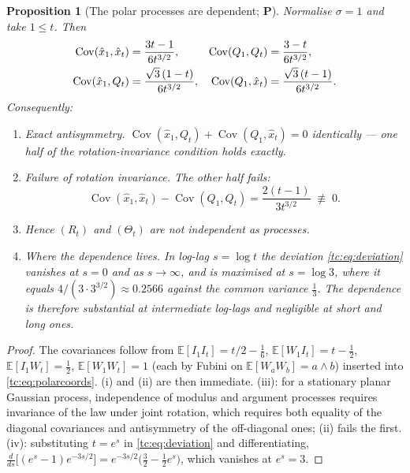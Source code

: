 \documentclass[11pt]{article}
\numberwithin{equation}{section}
\theoremstyle{plain}
\newtheorem{proposition}[theorem]{Proposition}
\theoremstyle{definition}
\theoremstyle{remark}
\newcommand{\E}{\mathbb{E}}
\DeclareMathOperator{\Cov}{Cov}
\begin{document}
\begin{proposition}[The polar processes are dependent; \textbf{P}]
\label{tc:prop:notindep}
Normalise $\sigma=1$ and take $1\le t$. Then
\begin{align}
\Cov(\hat x_1,\hat x_t)&=\frac{3t-1}{6t^{3/2}},
&\Cov(Q_1,Q_t)&=\frac{3-t}{6t^{3/2}},
\label{tc:eq:covs}\\
\Cov(\hat x_1,Q_t)&=\frac{\sqrt3\,(1-t)}{6t^{3/2}},
&\Cov(Q_1,\hat x_t)&=\frac{\sqrt3\,(t-1)}{6t^{3/2}} .
\notag
\end{align}
Consequently:
\begin{enumerate}[label=\emph{(\roman*)},itemsep=1pt]
\item \emph{Exact antisymmetry.}
$\Cov(\hat x_1,Q_t)+\Cov(Q_1,\hat x_t)=0$ identically --- one half of
the rotation-invariance condition holds exactly.
\item \emph{Failure of rotation invariance.} The other half fails:
\begin{equation}\label{tc:eq:deviation}
\Cov(\hat x_1,\hat x_t)-\Cov(Q_1,Q_t)=\frac{2(t-1)}{3t^{3/2}}
\;\not\equiv\;0 .
\end{equation}
\item Hence $(R_t)$ and $(\Theta_t)$ are \emph{not} independent as
processes.
\item \emph{Where the dependence lives.} In log-lag $s=\log t$ the
deviation \eqref{tc:eq:deviation} vanishes at $s=0$ and as
$s\to\infty$, and is maximised at $s=\log3$, where it equals
$4/(3\cdot3^{3/2})\approx0.2566$ against the common variance
$\tfrac13$. The dependence is therefore substantial at intermediate
log-lags and negligible at short and long ones.
\end{enumerate}
\end{proposition}

\begin{proof}
The covariances follow from $\E[I_1I_t]=t/2-\tfrac16$,
$\E[W_1I_t]=t-\tfrac12$, $\E[I_1W_t]=\tfrac12$, $\E[W_1W_t]=1$ (each by
Fubini on $\E[W_aW_b]=a\wedge b$) inserted into
\eqref{tc:eq:polarcoords}. (i) and (ii) are then immediate.
(iii): for a stationary planar Gaussian process, independence of modulus
and argument processes requires invariance of the law under joint
rotation, which requires both equality of the diagonal covariances and
antisymmetry of the off-diagonal ones; (ii) fails the first. (iv):
substituting $t=e^{s}$ in \eqref{tc:eq:deviation} and differentiating,
$\frac{d}{ds}\bigl[(e^{s}-1)e^{-3s/2}\bigr]
=e^{-3s/2}\bigl(\tfrac32-\tfrac12e^{s}\bigr)$, which vanishes at
$e^{s}=3$.
\end{proof}
\end{document}
